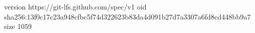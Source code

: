 version https://git-lfs.github.com/spec/v1
oid sha256:13f0c17c23a948cfbc5f74d322623b83da4d091b27d7a3307a6fd8cd448bb9a7
size 1059
